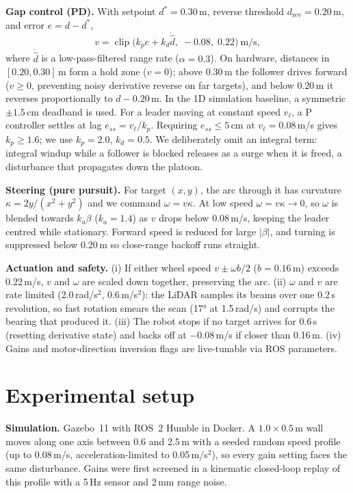 \documentclass[11pt,a4paper,twocolumn]{article}
\begin{document}
\textbf{Gap control (PD).} With setpoint $d^\ast{=}0.30$\,m, reverse threshold
$d_{\text{rev}}{=}0.20$\,m, and error $e=d-d^\ast$,
\begin{equation}
  v = \operatorname{clip}\big(k_p e + k_d \dot{\hat d},\; -0.08,\; 0.22\big)\ \text{m/s},
\end{equation}
where $\dot{\hat d}$ is a low-pass-filtered range rate ($\alpha{=}0.3$). On hardware,
distances in $[0.20, 0.30]$\,m form a hold zone ($v{=}0$); above 0.30\,m the follower
drives forward ($v\ge0$, preventing noisy derivative reverse on far targets), and below
0.20\,m it reverses proportionally to $d-0.20$\,m. In the 1D simulation baseline, a symmetric
$\pm1.5$\,cm deadband is used. For a leader moving at constant speed $v_\ell$, a P
controller settles at lag $e_{ss}=v_\ell/k_p$. Requiring $e_{ss}\le5$\,cm at
$v_\ell{=}0.08$\,m/s gives $k_p\ge1.6$; we use $k_p{=}2.0$, $k_d{=}0.5$. We deliberately
omit an integral term: integral windup while a follower is blocked releases as a surge when
it is freed, a disturbance that propagates down the platoon.

\textbf{Steering (pure pursuit).} For target $(x,y)$, the arc through it has curvature
$\kappa=2y/(x^2+y^2)$ and we command $\omega=v\kappa$. At low speed
$\omega=v\kappa\to0$, so $\omega$ is blended towards $k_a\beta$ ($k_a{=}1.4$) as $v$ drops
below 0.08\,m/s, keeping the leader centred while stationary. Forward speed is reduced for
large $|\beta|$, and turning is suppressed below 0.20\,m so close-range backoff runs
straight.

\textbf{Actuation and safety.} (i) If either wheel speed $v\pm\omega b/2$ ($b{=}0.16$\,m)
exceeds 0.22\,m/s, $v$ and $\omega$ are scaled down together, preserving the arc.
(ii) $\omega$ and $v$ are rate limited (2.0\,rad/s$^2$, 0.6\,m/s$^2$): the LiDAR samples its
beams over one 0.2\,s revolution, so fast rotation smears the scan (17° at 1.5\,rad/s) and
corrupts the bearing that produced it. (iii) The robot stops if no target arrives for 0.6\,s
(resetting derivative state) and backs off at $-0.08$\,m/s if closer than 0.16\,m.
(iv) Gains and motor-direction inversion flags are live-tunable via ROS parameters.

\section{Experimental setup}
\textbf{Simulation.} Gazebo~11 with ROS~2 Humble in Docker. A $1.0\times0.5$\,m wall moves
along one axis between 0.6 and 2.5\,m with a seeded random speed profile (up to 0.08\,m/s,
acceleration-limited to 0.05\,m/s$^2$), so every gain setting faces the same disturbance.
Gains were first screened in a kinematic closed-loop replay of this profile with a 5\,Hz
sensor and 2\,mm range noise.
\end{document}
